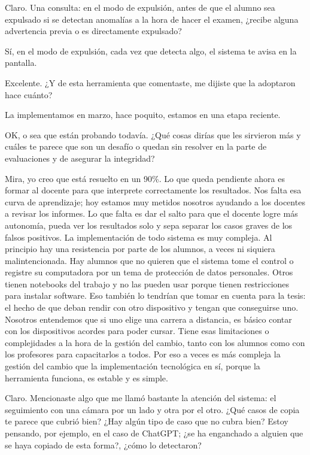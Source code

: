 \begin{description}[leftmargin=0cm, labelsep=0.5cm, style=nextline]
\item[\textbf{Entrevistador:}] Claro. Una consulta: en el modo de expulsión, antes de que el alumno sea expulsado si se detectan anomalías a la hora de hacer el examen, ¿recibe alguna advertencia previa o es directamente expulsado?
\item[\textbf{Entrevistado:}] Sí, en el modo de expulsión, cada vez que detecta algo, el sistema te avisa en la pantalla.
\item[\textbf{Entrevistador:}] Excelente. ¿Y de esta herramienta que comentaste, me dijiste que la adoptaron hace cuánto?
\item[\textbf{Entrevistado:}] La implementamos en marzo, hace poquito, estamos en una etapa reciente.
\item[\textbf{Entrevistador:}] OK, o sea que están probando todavía. ¿Qué cosas dirías que les sirvieron más y cuáles te parece que son un desafío o quedan sin resolver en la parte de evaluaciones y de asegurar la integridad?
\item[\textbf{Entrevistado:}] Mira, yo creo que está resuelto en un 90\%. Lo que queda pendiente ahora es formar al docente para que interprete correctamente los resultados. Nos falta esa curva de aprendizaje; hoy estamos muy metidos nosotros ayudando a los docentes a revisar los informes. Lo que falta es dar el salto para que el docente logre más autonomía, pueda ver los resultados solo y sepa separar los casos graves de los falsos positivos. La implementación de todo sistema es muy compleja. Al principio hay una resistencia por parte de los alumnos, a veces ni siquiera malintencionada. Hay alumnos que no quieren que el sistema tome el control o registre su computadora por un tema de protección de datos personales. Otros tienen notebooks del trabajo y no las pueden usar porque tienen restricciones para instalar software. Eso también lo tendrían que tomar en cuenta para la tesis: el hecho de que deban rendir con otro dispositivo y tengan que conseguirse uno. Nosotros entendemos que si uno elige una carrera a distancia, es básico contar con los dispositivos acordes para poder cursar. Tiene esas limitaciones o complejidades a la hora de la gestión del cambio, tanto con los alumnos como con los profesores para capacitarlos a todos. Por eso a veces es más compleja la gestión del cambio que la implementación tecnológica en sí, porque la herramienta funciona, es estable y es simple.
\item[\textbf{Entrevistador:}] Claro. Mencionaste algo que me llamó bastante la atención del sistema: el seguimiento con una cámara por un lado y otra por el otro. ¿Qué casos de copia te parece que cubrió bien? ¿Hay algún tipo de caso que no cubra bien? Estoy pensando, por ejemplo, en el caso de ChatGPT; ¿se ha enganchado a alguien que se haya copiado de esta forma?, ¿cómo lo detectaron?

\end{description}
